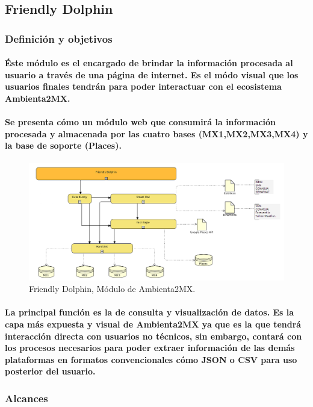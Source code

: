 \subsection{Friendly Dolphin}
  \subsubsection{Definición y objetivos}
    \paragraph{Éste módulo es el encargado de brindar la información procesada al usuario a través de una página de internet. Es el módo visual que los usuarios finales tendrán para poder interactuar con el ecosistema Ambienta2MX.}
    \paragraph{Se presenta cómo un módulo web que consumirá la información procesada y almacenada por las cuatro bases (MX1,MX2,MX3,MX4) y la base de soporte (Places).}
    \begin{figure}[h!]
        \centering
          \includegraphics[width=\textwidth]{./images/DiagramaAmbienta2MX_FriendlyDolphin.png}
        \caption{Friendly Dolphin, Módulo de Ambienta2MX.}
    \end{figure}
    \paragraph{La principal función es la de consulta y visualización de datos. Es la capa más expuesta y visual de Ambienta2MX ya que es la que tendrá interacción directa con usuarios no técnicos, sin embargo, contará con los procesos necesarios para poder extraer información de las demás plataformas en formatos convencionales cómo JSON o CSV para uso posterior del usuario.}
  \subsubsection{Alcances}
